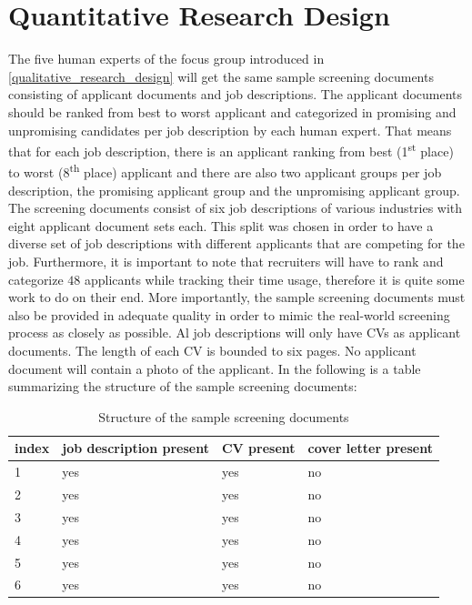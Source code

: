 \documentclass[draft,final]{thesisclass} %
\begin{document}
\section{Quantitative Research Design} \label{quantitative_research_design}
The five human experts of the focus group introduced in \ref{qualitative_research_design} will get the same sample screening documents consisting of applicant documents and job descriptions.
The applicant documents should be ranked from best to worst applicant and categorized in promising and unpromising candidates per job description by each human expert.
That means that for each job description, there is an applicant ranking from best (1\textsuperscript{st} place) to worst (8\textsuperscript{th} place) applicant and there are also two applicant groups per job description, the promising applicant group and the unpromising applicant group.
The screening documents consist of six job descriptions of various industries with eight applicant document sets each.
This split was chosen in order to have a diverse set of job descriptions with different applicants that are competing for the job.
Furthermore, it is important to note that recruiters will have to rank and categorize $48$ applicants while tracking their time usage, therefore it is quite some work to do on their end.
More importantly, the sample screening documents must also be provided in adequate quality in order to mimic the real-world screening process as closely as possible.
Al job descriptions will only have \acs{CV}s as applicant documents.
The length of each \acs{CV} is bounded to six pages.
No applicant document will contain a photo of the applicant.
In the following is a table summarizing the structure of the sample screening documents:
\begin{table}[H]
    \begin{tabular}{|l|l|l|l|}
    \hline
    \textbf{index} & \textbf{job description present} & \textbf{\acs{CV} present} & \textbf{cover letter present} \\ \hline
    1 & yes & yes & no \\ \hline
    2 & yes & yes & no \\ \hline
    3 & yes & yes & no \\ \hline
    4 & yes & yes & no \\ \hline
    5 & yes & yes & no \\ \hline
    6 & yes & yes & no \\ \hline
    \end{tabular}
    \caption{Structure of the sample screening documents}
\end{table}
\end{document}
